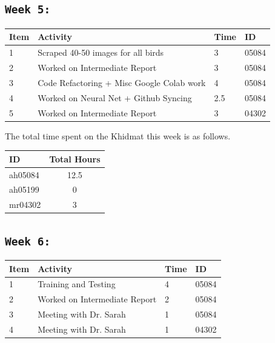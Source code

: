 \documentclass{article}
\begin{document}
\subsection{\texttt{Week 5: }}
\begin{center}
\begin{tabular}{|l|l|l|l|}
  \hline
  \textbf{Item} 	& \textbf{Activity} & \textbf{Time} & \textbf{ID} \\\hline
    1 & Scraped 40-50 images for all birds & 3 & 05084 \\ \hline
    2 & Worked on Intermediate Report & 3 & 05084 \\ \hline
    3 & Code Refactoring + Misc Google Colab work & 4 & 05084 \\ \hline
    4 & Worked on Neural Net + Github Syncing & 2.5 & 05084 \\ \hline
    5 & Worked on Intermediate Report & 3 & 04302 \\ \hline
\end{tabular}
    
\end{center}
The total time spent on the Khidmat this week is as follows.    
\begin{center}
\begin{tabular}{|l|c|}
  \hline
  \textbf{ID} & \textbf{Total Hours}\\\hline
  ah05084 & 12.5 \\\hline
  ah05199 & 0 \\\hline
  mr04302 & 3 \\\hline
\end{tabular}
\end{center}
\newpage

\subsection{\texttt{Week 6: }}
\begin{center}
\begin{tabular}{|l|l|l|l|}
  \hline
  \textbf{Item} 	& \textbf{Activity} & \textbf{Time} & \textbf{ID} \\\hline
  1 & Training and Testing & 4 & 05084  \\ \hline
  2 & Worked on Intermediate Report & 2 & 05084 \\ \hline
  3 & Meeting with Dr. Sarah & 1 & 05084 \\ \hline
  4 & Meeting with Dr. Sarah & 1 & 04302 \\ \hline
  
\end{tabular}
    
\end{center}
\end{document}
